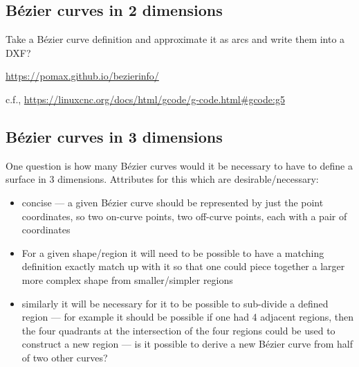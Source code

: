 \documentclass{ltxdoc}
\begin{document}
\subsection{Bézier curves in 2 dimensions}

Take a Bézier curve definition and approximate it as arcs and write them into a DXF?

\url{https://pomax.github.io/bezierinfo/}

c.f., \url{https://linuxcnc.org/docs/html/gcode/g-code.html#gcode:g5}

%
%
%
%
%
%
%
%

\subsection{Bézier curves in 3 dimensions}
 
One question is how many Bézier curves would it be necessary to have to define a surface
in 3 dimensions. Attributes for this which are desirable/necessary:

\begin{itemize}
\item concise --- a given Bézier curve should be represented by just the point coordinates, 
      so two on-curve points, two off-curve points, each with a pair of coordinates
\item For a given shape/region it will need to be possible to have a matching definition 
      exactly match up with it so that one could piece together a larger more complex shape 
      from smaller/simpler regions
\item similarly it will be necessary for it to be possible to sub-divide a defined region --- 
      for example it should be possible if one had 4 adjacent regions, then the four quadrants 
      at the intersection of the four regions could be used to construct a new region --- is it
      possible to derive a new Bézier curve from half of two other curves?
\end{itemize}
\end{document}
